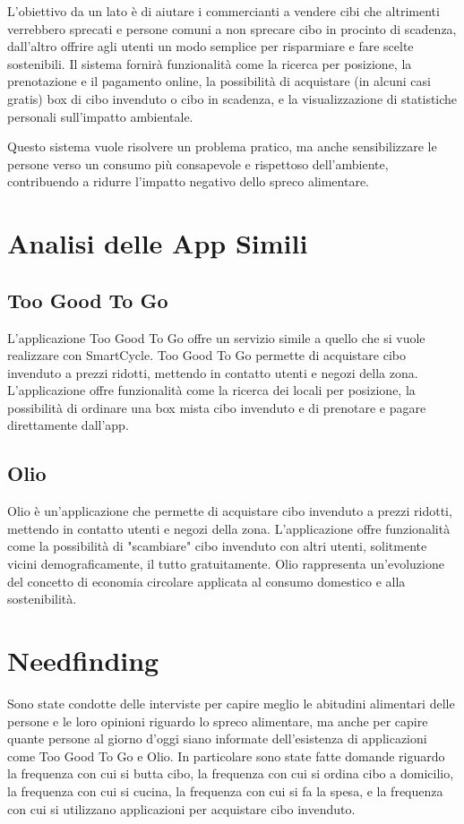 \documentclass{article}
\begin{document}
L’obiettivo da un lato è di aiutare i commercianti a vendere cibi che altrimenti verrebbero sprecati e persone comuni a non sprecare cibo in procinto di scadenza, dall’altro offrire agli utenti un modo semplice per risparmiare e fare scelte sostenibili. 
Il sistema fornirà funzionalità come la ricerca per posizione, la prenotazione e il pagamento online, la possibilità di acquistare (in alcuni casi gratis) box di cibo invenduto o cibo in scadenza, e la visualizzazione di statistiche personali sull’impatto ambientale.

Questo sistema vuole risolvere un problema pratico, ma anche sensibilizzare le persone verso un consumo più consapevole e rispettoso dell’ambiente, contribuendo a ridurre l’impatto negativo dello spreco alimentare.

\section{Analisi delle App Simili}
\subsection{Too Good To Go}
L'applicazione Too Good To Go offre un servizio simile a quello che si vuole realizzare con SmartCycle.
Too Good To Go permette di acquistare cibo invenduto a prezzi ridotti, mettendo in contatto utenti e negozi della zona.
L'applicazione offre funzionalità come la ricerca dei locali per posizione, la possibilità di ordinare una box mista cibo invenduto e di prenotare e pagare direttamente dall'app.

\subsection{Olio}
Olio è un'applicazione che permette di acquistare cibo invenduto a prezzi ridotti, mettendo in contatto utenti e negozi della zona.
L'applicazione offre funzionalità come la possibilità di "scambiare" cibo invenduto con altri utenti, solitmente vicini demograficamente, il tutto gratuitamente.
Olio rappresenta un’evoluzione del concetto di economia circolare applicata al consumo domestico e alla sostenibilità.

\newpage
\section{Needfinding}
Sono state condotte delle interviste per capire meglio le abitudini alimentari delle persone e le loro opinioni riguardo lo spreco alimentare, ma anche per capire quante persone al giorno d'oggi siano informate dell'esistenza di applicazioni come Too Good To Go e Olio.
In particolare sono state fatte domande riguardo la frequenza con cui si butta cibo, la frequenza con cui si ordina cibo a domicilio, la frequenza con cui si cucina, la frequenza con cui si fa la spesa, e la frequenza con cui si utilizzano applicazioni per acquistare cibo invenduto.
\end{document}
